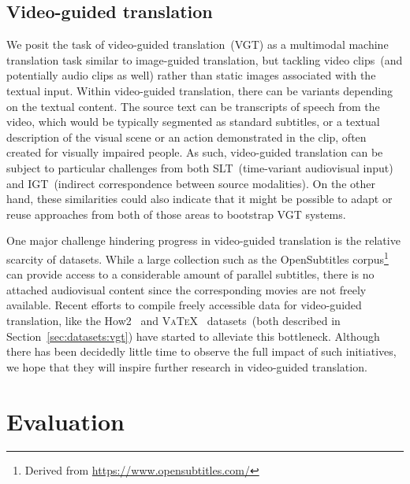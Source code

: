 \documentclass{svjour3}
\newcommand{\vatex}{\textsc{VaTeX}}
\begin{document}
        


    \subsection{Video-guided translation}
    \label{sec:tasks:videosub}
        
        We posit the task of video-guided translation~(VGT) as a multimodal machine translation task similar to image-guided translation, but tackling video clips~(and potentially audio clips as well) rather than static images associated with the textual input. Within video-guided translation, there can be variants depending on the textual content. The source text can be transcripts of speech from the video, which would be typically segmented as standard subtitles, or a textual description of the visual scene or an action demonstrated in the clip, often created for visually impaired people. As such, video-guided translation can be subject to particular challenges from both SLT~(time-variant audiovisual input) and IGT~(indirect correspondence between source modalities). On the other hand, these similarities could also indicate that it might be possible to adapt or reuse approaches from both of those areas to bootstrap VGT systems.


        One major challenge hindering progress in video-guided translation is the relative scarcity of datasets. While a large collection such as the OpenSubtitles corpus\footnote{Derived from \url{https://www.opensubtitles.com/}}~\citep{lison-opensubtitles2016:-2016}
can provide access to a considerable amount of parallel subtitles, there is no attached audiovisual content since the corresponding movies are not freely available. Recent efforts to compile freely accessible data for video-guided translation, like the How2~\citep{sanabria-how2:-2018} and \vatex{}~\citep{wang-vatex-2019} datasets~(both described in Section~\ref{sec:datasets:vgt}) have started to alleviate this bottleneck. Although there has been decidedly little time to observe the full impact of such initiatives, we hope that they will inspire further research in video-guided translation.
    


     


\section{Evaluation}
\label{sec:eval}
    
\end{document}
